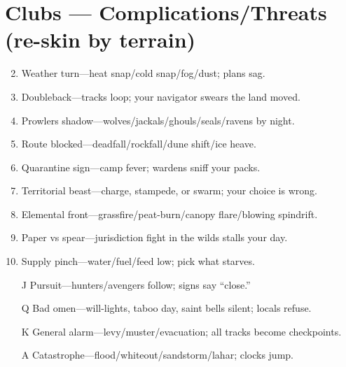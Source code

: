 \section*{Clubs --- Complications/Threats (re-skin by terrain)}
\begin{enumerate}
\setcounter{enumi}{1}
\item Weather turn---heat snap/cold snap/fog/dust; plans sag.
\item Doubleback---tracks loop; your navigator swears the land moved.
\item Prowlers shadow---wolves/jackals/ghouls/seals/ravens by night.
\item Route blocked---deadfall/rockfall/dune shift/ice heave.
\item Quarantine sign---camp fever; wardens sniff your packs.
\item Territorial beast---charge, stampede, or swarm; your choice is wrong.
\item Elemental front---grassfire/peat-burn/canopy flare/blowing spindrift.
\item Paper vs spear---jurisdiction fight in the wilds stalls your day.
\item Supply pinch---water/fuel/feed low; pick what starves.
\item[J] Pursuit---hunters/avengers follow; signs say ``close.''
\item[Q] Bad omen---will-lights, taboo day, saint bells silent; locals refuse.
\item[K] General alarm---levy/muster/evacuation; all tracks become checkpoints.
\item[A] Catastrophe---flood/whiteout/sandstorm/lahar; clocks jump.
\end{enumerate}

